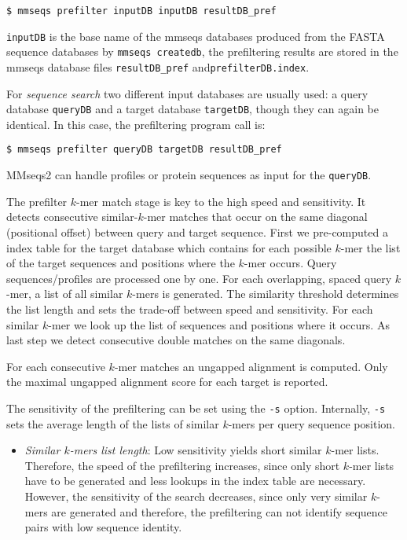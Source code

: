 \documentclass[11pt,a4paper]{scrreprt}
\begin{document}
\begin{verbatim}
$ mmseqs prefilter inputDB inputDB resultDB_pref
\end{verbatim}

\texttt{inputDB} is the base name of the mmseqs databases produced from the FASTA sequence databases by \texttt{mmseqs createdb}, the prefiltering results are stored in the mmseqs database files \texttt{resultDB\_pref} and\texttt{prefilterDB.index}.

For \emph{sequence search} two different input databases are usually used: a query database \texttt{queryDB} and a target database \texttt{targetDB}, though they can again be identical. In this case, the prefiltering program call is:

\begin{verbatim}
$ mmseqs prefilter queryDB targetDB resultDB_pref 
\end{verbatim}

MMseqs2 can handle profiles or protein sequences as input for the \texttt{queryDB}.
 
The prefilter $k$-mer match stage is key to the high speed and sensitivity. It detects consecutive similar-$k$-mer matches that occur on the same diagonal (positional offset) between query and target sequence. First we pre-computed a index table for the target database which contains for each possible $k$-mer the list of the target sequences and positions where the $k$-mer occurs. Query sequences/profiles are processed one by one. For each overlapping, spaced query $k$-mer, a list of all similar $k$-mers is generated. The similarity threshold determines the list length and sets the trade-off between speed and sensitivity. For each similar $k$-mer we look up the list of sequences and positions where it occurs.  As last step we detect consecutive double matches on the same diagonals.

For each consecutive $k$-mer matches an ungapped alignment is computed. Only the maximal ungapped alignment score for each target is reported. 

The sensitivity of the prefiltering can be set using the \texttt{-s} option. Internally, \texttt{-s} sets the average length of the lists of similar $k$-mers per query sequence position.

\begin{itemize}
\item \emph{Similar $k$-mers list length}: Low sensitivity yields short similar $k$-mer lists. Therefore, the speed of the prefiltering increases, since only short $k$-mer lists have to be generated and less lookups in the index table are necessary. However, the sensitivity of the search decreases, since only very similar $k$-mers are generated and therefore, the prefiltering can not identify sequence pairs with low sequence identity.
\end{itemize}
\end{document}
